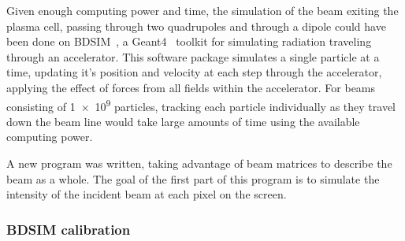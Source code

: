Given enough computing power and time, the simulation of the beam exiting the
plasma cell, passing through two quadrupoles and through a dipole could have
been done on BDSIM~\cite{agapov2009bdsim}, a Geant4~\cite{agostinelli2003geant4}
toolkit for simulating radiation traveling through an accelerator. This software
package simulates a single particle at a time, updating it's position and
velocity at each step through the accelerator, applying the effect of forces
from all fields within the accelerator.  For beams consisting of \num{1e9}
particles, tracking each particle individually as they travel down the beam line
would take large amounts of time using the available computing power.

A new program was written, taking advantage of beam matrices to describe the
beam as a whole. The goal of the first part of this program is to simulate the
intensity of the incident beam at each pixel on the screen.

\subsubsection{BDSIM calibration}

